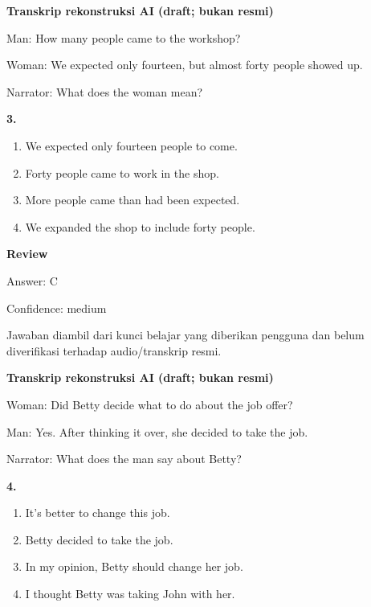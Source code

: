 \documentclass[12pt]{article}
\begin{document}
\par
\vspace{0.25\baselineskip}
\begin{exampleblock}
\textbf{Transkrip rekonstruksi AI (draft; bukan resmi)}\par
Man: How many people came to the workshop?\par
Woman: We expected only fourteen, but almost forty people showed up.\par
Narrator: What does the woman mean?\par
\end{exampleblock}
\noindent\textbf{3.}
\begin{enumerate}[label=(\Alph*),leftmargin=*,itemsep=0.2em]
\item We expected only fourteen people to come.
\item Forty people came to work in the shop.
\item More people came than had been expected.
\item We expanded the shop to include forty people.
\end{enumerate}
\par
\begingroup
\setlength{\parskip}{0pt}
\setlength{\parindent}{0pt}
\textbf{Review}\par
Answer: C\par
Confidence: medium\par
Jawaban diambil dari kunci belajar yang diberikan pengguna dan belum diverifikasi terhadap audio/transkrip resmi.\par
\endgroup
\par
\vspace{0.25\baselineskip}
\begin{exampleblock}
\textbf{Transkrip rekonstruksi AI (draft; bukan resmi)}\par
Woman: Did Betty decide what to do about the job offer?\par
Man: Yes. After thinking it over, she decided to take the job.\par
Narrator: What does the man say about Betty?\par
\end{exampleblock}
\noindent\textbf{4.}
\begin{enumerate}[label=(\Alph*),leftmargin=*,itemsep=0.2em]
\item It's better to change this job.
\item Betty decided to take the job.
\item In my opinion, Betty should change her job.
\item I thought Betty was taking John with her.
\end{enumerate}
\end{document}
